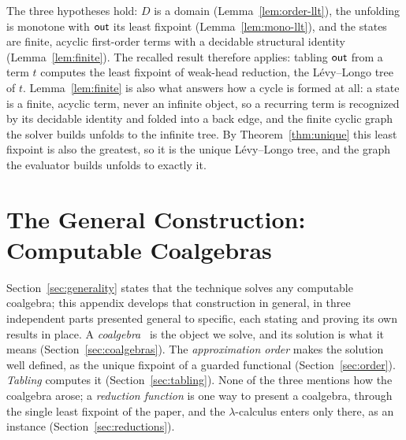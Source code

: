 \noindent
The three hypotheses hold: $D$ is a domain (Lemma~\ref{lem:order-llt}), the unfolding is monotone with $\mathsf{out}$ its least fixpoint (Lemma~\ref{lem:mono-llt}), and the states are finite, acyclic first-order terms with a decidable structural identity (Lemma~\ref{lem:finite}). The recalled result therefore applies: tabling $\mathsf{out}$ from a term $t$ computes the least fixpoint of weak-head reduction, the L\'evy--Longo tree of $t$. Lemma~\ref{lem:finite} is also what answers how a cycle is formed at all: a state is a finite, acyclic term, never an infinite object, so a recurring term is recognized by its decidable identity and folded into a back edge, and the finite cyclic graph the solver builds unfolds to the infinite tree. By Theorem~\ref{thm:unique} this least fixpoint is also the greatest, so it is the unique L\'evy--Longo tree, and the graph the evaluator builds unfolds to exactly it.

\section{The General Construction: Computable Coalgebras}\label{sec:method}
Section~\ref{sec:generality} states that the technique solves any computable coalgebra; this appendix develops that construction in general, in three independent parts presented general to specific, each stating and proving its own results in place. A \emph{coalgebra}~\cite{rutten2000-universal-coalgebra} is the object we solve, and its solution is what it means (Section~\ref{sec:coalgebras}). The \emph{approximation order} makes the solution well defined, as the unique fixpoint of a guarded functional (Section~\ref{sec:order}). \emph{Tabling} computes it (Section~\ref{sec:tabling}). None of the three mentions how the coalgebra arose; a \emph{reduction function} is one way to present a coalgebra, through the single least fixpoint of the paper, and the $\lambda$-calculus enters only there, as an instance (Section~\ref{sec:reductions}).

